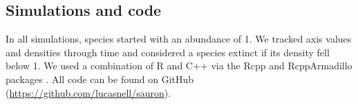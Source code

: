 \subsection*{Simulations and code}

In all simulations, species started with an abundance of 1.
We tracked axis values and densities through time and considered 
a species extinct if its density fell below 1.
We used a combination of R \citep{RCoreTeam2020} and
C++ via the Rcpp and RcppArmadillo packages
\citep{Eddelbuettel2014a,Eddelbuettel2013a,Sanderson2016}.
All code can be found on GitHub
(\url{https://github.com/lucasnell/sauron}).



